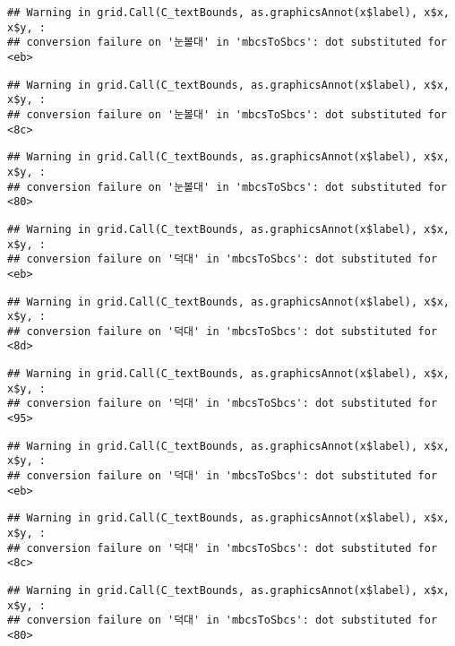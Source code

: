 \documentclass[
]{article}
\begin{document}
\begin{verbatim}
## Warning in grid.Call(C_textBounds, as.graphicsAnnot(x$label), x$x, x$y, :
## conversion failure on '눈볼대' in 'mbcsToSbcs': dot substituted for <eb>
\end{verbatim}

\begin{verbatim}
## Warning in grid.Call(C_textBounds, as.graphicsAnnot(x$label), x$x, x$y, :
## conversion failure on '눈볼대' in 'mbcsToSbcs': dot substituted for <8c>
\end{verbatim}

\begin{verbatim}
## Warning in grid.Call(C_textBounds, as.graphicsAnnot(x$label), x$x, x$y, :
## conversion failure on '눈볼대' in 'mbcsToSbcs': dot substituted for <80>
\end{verbatim}

\begin{verbatim}
## Warning in grid.Call(C_textBounds, as.graphicsAnnot(x$label), x$x, x$y, :
## conversion failure on '덕대' in 'mbcsToSbcs': dot substituted for <eb>
\end{verbatim}

\begin{verbatim}
## Warning in grid.Call(C_textBounds, as.graphicsAnnot(x$label), x$x, x$y, :
## conversion failure on '덕대' in 'mbcsToSbcs': dot substituted for <8d>
\end{verbatim}

\begin{verbatim}
## Warning in grid.Call(C_textBounds, as.graphicsAnnot(x$label), x$x, x$y, :
## conversion failure on '덕대' in 'mbcsToSbcs': dot substituted for <95>
\end{verbatim}

\begin{verbatim}
## Warning in grid.Call(C_textBounds, as.graphicsAnnot(x$label), x$x, x$y, :
## conversion failure on '덕대' in 'mbcsToSbcs': dot substituted for <eb>
\end{verbatim}

\begin{verbatim}
## Warning in grid.Call(C_textBounds, as.graphicsAnnot(x$label), x$x, x$y, :
## conversion failure on '덕대' in 'mbcsToSbcs': dot substituted for <8c>
\end{verbatim}

\begin{verbatim}
## Warning in grid.Call(C_textBounds, as.graphicsAnnot(x$label), x$x, x$y, :
## conversion failure on '덕대' in 'mbcsToSbcs': dot substituted for <80>
\end{verbatim}
\end{document}
